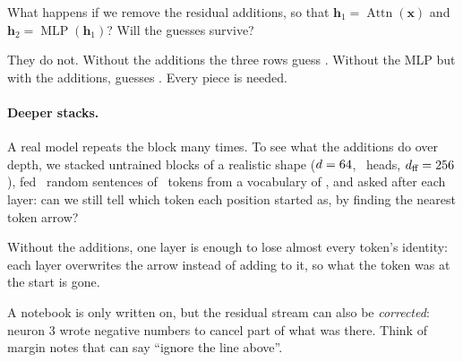 \Predict What happens if we remove the residual additions, so that $\bm{h}_1=\operatorname{Attn}(\bm{x})$ and
$\bm{h}_2=\operatorname{MLP}(\bm{h}_1)$? Will the guesses survive?

\Sanity They do not. Without the additions the three rows guess \nFiveNoResPreds. Without the MLP but with the
additions,  guesses \tok{\nFiveNoMlpPredTime}. Every piece is needed.

\paragraph{Deeper stacks.} A real model repeats the block many times. To see what the additions do over depth,
we stacked untrained blocks of a realistic shape ($d=64$, \nFiveRbH\ heads, $d_{\text{ff}}=256$),
fed \nFiveRbSeqs\ random sentences of \nFiveRbT\ tokens from a vocabulary of \nFiveRbV, and asked after each
layer: can we still tell which token each position started as, by finding the nearest token arrow?

\begin{center}
\end{center}

Without the additions, one layer is enough to lose almost every token's identity: each layer overwrites the
arrow instead of adding to it, so what the token was at the start is gone.

\begin{breaks}
A notebook is only written on, but the residual stream can also be \emph{corrected}: neuron 3 wrote negative
numbers to cancel part of what was there. Think of margin notes that can say ``ignore the line above''.
\end{breaks}

